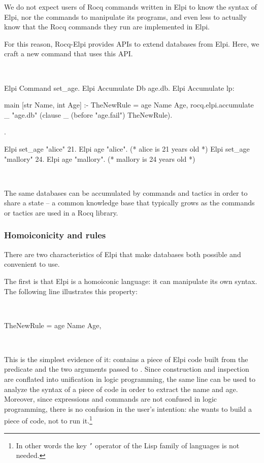 \documentclass[a4paper, 11pt]{book}
\newenvironment{elpicode}
  {\VerbatimEnvironment~\\\begin{elpibox}\begin{xelpicode}}{\end{xelpicode}
\end{elpibox}\\}
\newenvironment{rocqcode}
  {\VerbatimEnvironment~\\\begin{rocqbox}\begin{xrocqcode}}{\end{xrocqcode}
\end{rocqbox}\\}
\begin{document}
We do not expect users of Rocq commands written in Elpi to know the syntax of
Elpi, nor the commands to manipulate its programs, and even less to actually
know that the Rocq commands they run are implemented in Elpi.


For this reason, Rocq-Elpi provides APIs to extend databases from Elpi. Here,
we craft a new command  that uses this API.

\begin{rocqcode}
Elpi Command set_age.
Elpi Accumulate Db age.db.
Elpi Accumulate lp:{{

  main [str Name, int Age] :-
    TheNewRule = age Name Age,
    rocq.elpi.accumulate _ "age.db"
      (clause _ (before "age.fail") TheNewRule).

}}.

Elpi set_age "alice" 21.
Elpi age "alice". (* alice is 21 years old *)
Elpi set_age "mallory" 24.
Elpi age "mallory". (* mallory is 24 years old *)
\end{rocqcode}


The same databases can be accumulated by commands and tactics in order to
share a state -- a common knowledge base that typically grows as the commands
or tactics are used in a Rocq library.

\subsubsection{Homoiconicity and rules}


There are two characteristics of Elpi that make databases both possible and
convenient to use.


The first is that Elpi is a homoiconic language: it can manipulate its own
syntax. The following line illustrates this property:

\begin{elpicode}
TheNewRule = age Name Age,
\end{elpicode}


This is the simplest evidence of it:  contains a piece of
Elpi code built from the  predicate and the two arguments passed to
. Since construction and inspection are conflated into unification
in logic programming, the same line can be used to analyze the syntax of a
piece of code in order to extract the name and age. Moreover, since expressions
and commands are not confused in logic programming, there is no confusion
in the user's intention: she wants to build a piece of code, not to run
it.\footnote{In other words the key \texttt{'} operator of the Lisp family
of languages is not needed.}
\end{document}
